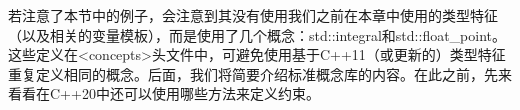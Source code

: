 若注意了本节中的例子，会注意到其没有使用我们之前在本章中使用的类型特征（以及相关的变量模板），而是使用了几个概念：std::integral和std::float_point。这些定义在<concepts>头文件中，可避免使用基于C++11（或更新的）类型特征重复定义相同的概念。后面，我们将简要介绍标准概念库的内容。在此之前，先来看看在C++20中还可以使用哪些方法来定义约束。
































































